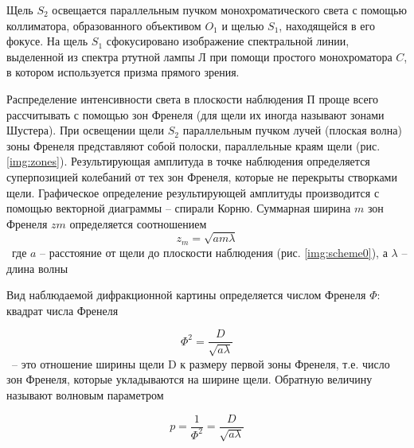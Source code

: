 \documentclass[a5paper,10pt, twoside]{article} %
\begin{document}
	Щель $S_2$ освещается параллельным пучком монохроматического света с помощью коллиматора, 
	образованного объективом $O_1$ и щелью $S_1$, находящейся в его фокусе. На щель $S_1$ сфокусировано
	изображение спектральной линии, выделенной из спектра ртутной лампы $\text{Л}$ при помощи
	простого монохроматора $C$, в котором используется призма прямого зрения.

	Распределение интенсивности света в плоскости наблюдения $\text{П}$ проще всего рассчитывать с
	помощью зон	Френеля (для щели их иногда называют зонами Шустера). При освещении щели $S_2$
	параллельным пучком	лучей (плоская волна) зоны Френеля представляют собой полоски, параллельные
	краям щели (рис. \ref{img:zones}). Результирующая амплитуда в точке наблюдения определяется суперпозицией 
	колебаний от тех зон Френеля, которые не перекрыты створками щели. Графическое определение
	результирующей амплитуды производится с помощью векторной диаграммы -- спирали Корню. 
	Суммарная ширина $m$ зон Френеля $z m$ определяется соотношением
	\begin{equation}\label{eq:wide}
		z_m = \sqrt{a m \lambda}
	\end{equation}
	\
	где $a$ -- расстояние от щели до плоскости наблюдения (рис. \ref{img:scheme0}), а $\lambda$ --
	длина волны

	Вид наблюдаемой дифракционной картины определяется числом Френеля $\Phi$: квадрат числа Френеля

	\begin{displaymath}
		\Phi^2 = \frac{D}{\sqrt{a \lambda}}
	\end{displaymath}
	\
	-- это отношение ширины щели D к размеру первой зоны Френеля, т.е. число зон Френеля, которые
	укладываются на ширине щели. Обратную величину называют волновым параметром

	\begin{displaymath}
		p = \frac{1}{\Phi^2} = \frac{D}{\sqrt{a \lambda}}
	\end{displaymath}
\end{document}
